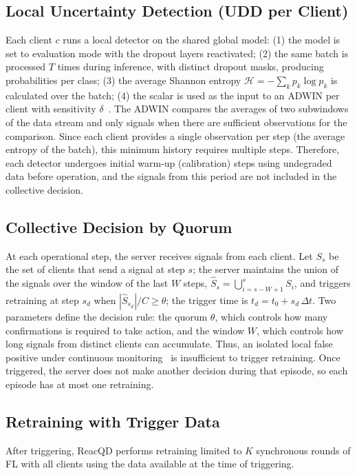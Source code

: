 \documentclass[conference]{IEEEtran}
\begin{document}
\subsection{Local Uncertainty Detection (UDD per Client)} Each client $c$ runs a local detector on the shared global model: (1) the model is set to evaluation mode with the dropout layers reactivated; (2) the same batch is processed $T$ times during inference, with distinct dropout masks, producing probabilities per class; (3) the average Shannon entropy $\mathcal{H}=-\sum_k p_k\log p_k$ is calculated over the batch; (4) the scalar is used as the input to an ADWIN per client with sensitivity $\delta$~\cite{bifet2007,baier2023}. The ADWIN compares the averages of two subwindows of the data stream and only signals when there are sufficient observations for the comparison. Since each client provides a single observation per step (the average entropy of the batch), this minimum history requires multiple steps. Therefore, each detector undergoes initial warm-up (calibration) steps using undegraded data before operation, and the signals from this period are not included in the collective decision.

\subsection{Collective Decision by Quorum} At each operational step, the server receives signals from each client. Let $S_s$ be the set of clients that send a signal at step $s$; the server maintains the union of the signals over the window of the last $W$ steps, $\hat{S}_s = \bigcup_{i=s-W+1}^{s} S_i$, and triggers retraining at step $s_d$ when $|\hat{S}_{s_d}|/C \ge \theta$; the trigger time is $t_d=t_0+s_d\,\Delta t$. Two parameters define the decision rule: the quorum $\theta$, which controls how many confirmations is required to take action, and the window $W$, which controls how long signals from distinct clients can accumulate. Thus, an isolated local false positive under continuous monitoring~\cite{poenaru2022} is insufficient to trigger retraining. Once triggered, the server does not make another decision during that episode, so each episode has at most one retraining.

\subsection{Retraining with Trigger Data} After triggering, ReacQD performs retraining limited to $K$ synchronous rounds of FL with all clients using the data available at the time of triggering.
\end{document}
